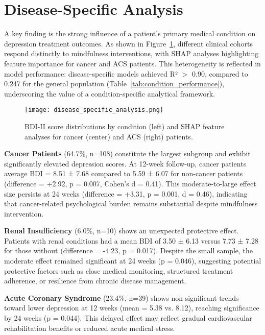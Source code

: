 \documentclass[conference]{IEEEtran}
\begin{document}
\section{Disease-Specific Analysis}

A key finding is the strong influence of a patient's primary medical condition on depression treatment outcomes. As shown in Figure~\ref{fig:disease_specific_analysis}, different clinical cohorts respond distinctly to mindfulness interventions, with SHAP analyses highlighting feature importance for cancer and ACS patients. This heterogeneity is reflected in model performance: disease-specific models achieved R² $>$ 0.90, compared to 0.247 for the general population (Table~\ref{tab:condition_performance}), underscoring the value of a condition-specific analytical framework.


\begin{figure}[th]
    \centering
    \texttt{[image: disease\_specific\_analysis.png]}
    \caption{BDI-II score distributions by condition (left) and SHAP feature analyses for cancer (center) and ACS (right) patients.}
    \label{fig:disease_specific_analysis}
\end{figure}

\textbf{Cancer Patients} (64.7\%, n=108) constitute the largest subgroup and exhibit significantly elevated depression scores. At 12-week follow-up, cancer patients average BDI = 8.51 ± 7.68 compared to 5.59 ± 6.07 for non-cancer patients (difference = +2.92, p = 0.007, Cohen's d = 0.41). This moderate-to-large effect size persists at 24 weeks (difference = +3.31, p = 0.001, d = 0.46), indicating that cancer-related psychological burden remains substantial despite mindfulness intervention.

\textbf{Renal Insufficiency} (6.0\%, n=10) shows an unexpected protective effect. Patients with renal conditions had a mean BDI of 3.50 ± 6.13 versus 7.73 ± 7.28 for those without (difference = -4.23, p = 0.017). Despite the small sample, the moderate effect remained significant at 24 weeks (p = 0.046), suggesting potential protective factors such as close medical monitoring, structured treatment adherence, or resilience from chronic disease management.

\textbf{Acute Coronary Syndrome} (23.4\%, n=39) shows non-significant trends toward lower depression at 12 weeks (mean = 5.38 vs. 8.12), reaching significance by 24 weeks (p = 0.044). This delayed effect may reflect gradual cardiovascular rehabilitation benefits or reduced acute medical stress.
\end{document}
